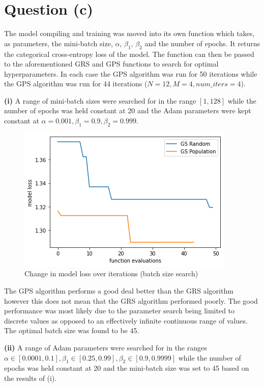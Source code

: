 \documentclass[12pt]{article}
\begin{document}
\section*{Question (c)}

The model compiling and training was moved into its own function which takes, as parameters, the mini-batch size, $\alpha$, $\beta_1$, $\beta_2$ and the number of epochs. It returns the categorical cross-entropy loss of the model. The function can then be passed to the aforementioned GRS and GPS functions to search for optimal hyperparameters. In each case the GPS algorithm was run for 50 iterations while the GPS algorithm was run for 44 iterations ($N=12, M=4, num\_iters=4$).

\noindent \textbf{(i)} A range of mini-batch sizes were searched for in the range $[1, 128]$ while the number of epochs was held constant at 20 and the Adam parameters were kept constant at $\alpha=0.001, \beta_1=0.9, \beta_2=0.999$. 

\begin{figure}[h]
    \centering
    \includegraphics[scale=0.55]{figs/c/c_i.png}
    \caption{Change in model loss over iterations (batch size search)}
    \label{fig:c_i}
\end{figure}

The GPS algorithm performs a good deal better than the GRS algorithm however this does not mean that the GRS algorithm performed poorly. The good performance was most likely due to the parameter search being limited to discrete values as opposed to an effectively infinite continuous range of values. The optimal batch size was found to be 45.

\noindent \textbf{(ii)} A range of Adam parameters were searched for in the ranges $\alpha \in [0.0001, 0.1], \beta_1 \in [0.25, 0.99], \beta_2 \in [0.9, 0.9999]$ while the number of epochs was held constant at 20 and the mini-batch size was set to 45 based on the results of (i).
\end{document}
